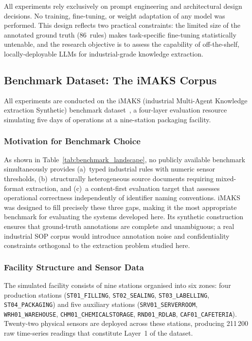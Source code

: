 ﻿\documentclass[11pt]{article}
\begin{document}
All experiments rely exclusively on prompt engineering and architectural
design decisions.
No training, fine-tuning, or weight adaptation of any model was performed.
This design reflects two practical constraints: the limited size of the annotated
ground truth (86~rules) makes task-specific fine-tuning statistically untenable,
and the research objective is to assess the capability of off-the-shelf,
locally-deployable LLMs for industrial-grade knowledge extraction.

\subsection{Benchmark Dataset: The iMAKS Corpus}
\label{sec:benchmark}

All experiments are conducted on the iMAKS (industrial Multi-Agent Knowledge
extraction Synthetic) benchmark dataset~\cite{bernardini2026imaks}, a
four-layer evaluation resource simulating five days of operations at a
nine-station packaging facility.

\subsubsection{Motivation for Benchmark Choice}
As shown in Table~\ref{tab:benchmark_landscape}, no publicly available benchmark
simultaneously provides (a)~typed industrial rules with numeric sensor thresholds,
(b)~structurally heterogeneous source documents requiring mixed-format extraction,
and (c)~a content-first evaluation target that assesses operational correctness
independently of identifier naming conventions.
iMAKS was designed to fill precisely these three gaps, making it the most
appropriate benchmark for evaluating the systems developed here.
Its synthetic construction ensures that ground-truth annotations are complete
and unambiguous; a real industrial SOP corpus would introduce annotation noise
and confidentiality constraints orthogonal to the extraction problem studied here.

\subsubsection{Facility Structure and Sensor Data}
The simulated facility consists of nine stations organised into six zones:
four production stations (\texttt{ST01\_FILLING}, \texttt{ST02\_SEALING},
\texttt{ST03\_LABELLING}, \texttt{ST04\_PACKAGING}) and five auxiliary stations
(\texttt{SRV01\_SERVERROOM}, \texttt{WRH01\_WAREHOUSE},
\texttt{CHM01\_CHEMICALSTORAGE}, \texttt{RND01\_RDLAB}, \texttt{CAF01\_CAFETERIA}).
Twenty-two physical sensors are deployed across these stations, producing
211\,200 raw time-series readings that constitute Layer~1 of the dataset.
\end{document}

